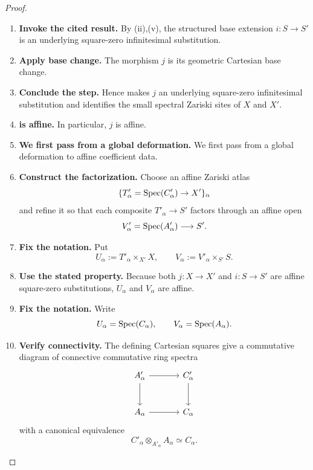 \begin{proof}
\leavevmode
\begin{enumerate}[label=\textup{(\arabic*)}]
    \item \textbf{Invoke the cited result.}
    By \textup{(ii),(v)}, the structured base
    extension \(i:S\to S'\) is an underlying square-zero infinitesimal substitution.

    \item \textbf{Apply base change.}
    The morphism \(j\) is its geometric Cartesian base change.

    \item \textbf{Conclude the step.}
    Hence  makes \(j\) an underlying
    square-zero infinitesimal substitution and identifies the small spectral Zariski sites of
    \(X\) and \(X'\).

    \item \textbf{is affine.}
    In particular, \(j\) is affine.

    \item \textbf{We first pass from a global deformation.}
    We first pass from a global deformation to affine coefficient data.

    \item \textbf{Construct the factorization.}
    Choose an affine Zariski atlas
    \[
        \{T'_\alpha=\operatorname{Spec}(C'_\alpha)\to X'\}_\alpha
    \]
    and refine it so that each composite \(T'_\alpha\to S'\) factors through an affine open
    \[
        V'_\alpha=\operatorname{Spec}(A'_\alpha)\longrightarrow S'.
    \]

    \item \textbf{Fix the notation.}
    Put
    \[
        U_\alpha:=T'_\alpha\times_{X'}X,
        \qquad
        V_\alpha:=V'_\alpha\times_{S'}S.
    \]

    \item \textbf{Use the stated property.}
    Because both \(j:X\to X'\) and \(i:S\to S'\) are affine square-zero substitutions, \(U_\alpha\)
    and \(V_\alpha\) are affine.

    \item \textbf{Fix the notation.}
    Write
    \[
        U_\alpha=\operatorname{Spec}(C_\alpha),
        \qquad
        V_\alpha=\operatorname{Spec}(A_\alpha).
    \]

    \item \textbf{Verify connectivity.}
    The defining Cartesian squares give a commutative diagram of connective commutative ring
    spectra
    \[
    \begin{tikzcd}[column sep=large,row sep=large]
        A'_\alpha \arrow[r] \arrow[d]
            & C'_\alpha \arrow[d]
        \\
        A_\alpha \arrow[r]
            & C_\alpha
    \end{tikzcd}
    \]
    with a canonical equivalence
    \[
        C'_\alpha\otimes_{A'_\alpha}A_\alpha
        \simeq
        C_\alpha.
    \]


\end{enumerate}
\end{proof}
